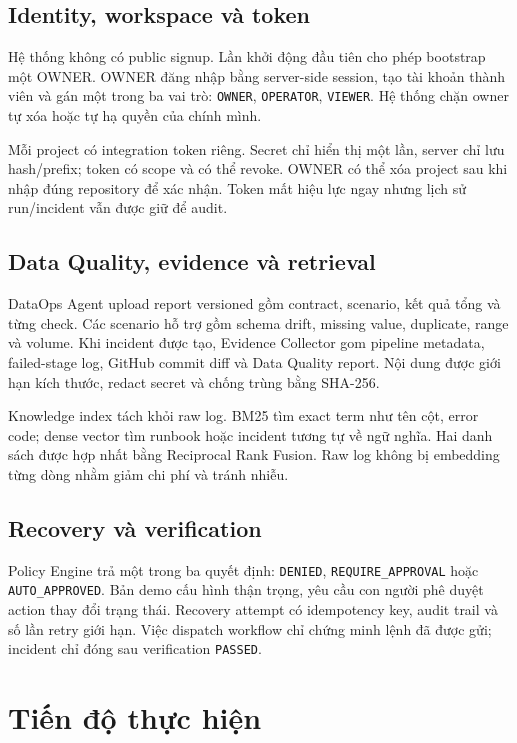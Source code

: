 \documentclass[12pt,a4paper,oneside]{report}
\newcommand{\code}[1]{\texttt{#1}}
\begin{document}
\section{Identity, workspace và token}

Hệ thống không có public signup. Lần khởi động đầu tiên cho phép bootstrap một OWNER. OWNER đăng
nhập bằng server-side session, tạo tài khoản thành viên và gán một trong ba vai trò:
\code{OWNER}, \code{OPERATOR}, \code{VIEWER}. Hệ thống chặn owner tự xóa hoặc tự hạ quyền của
chính mình.

Mỗi project có integration token riêng. Secret chỉ hiển thị một lần, server chỉ lưu hash/prefix;
token có scope và có thể revoke. OWNER có thể xóa project sau khi nhập đúng repository để xác nhận.
Token mất hiệu lực ngay nhưng lịch sử run/incident vẫn được giữ để audit.

\section{Data Quality, evidence và retrieval}

DataOps Agent upload report versioned gồm contract, scenario, kết quả tổng và từng check. Các
scenario hỗ trợ gồm schema drift, missing value, duplicate, range và volume. Khi incident được
tạo, Evidence Collector gom pipeline metadata, failed-stage log, GitHub commit diff và Data
Quality report. Nội dung được giới hạn kích thước, redact secret và chống trùng bằng SHA-256.

Knowledge index tách khỏi raw log. BM25 tìm exact term như tên cột, error code; dense vector tìm
runbook hoặc incident tương tự về ngữ nghĩa. Hai danh sách được hợp nhất bằng Reciprocal Rank
Fusion. Raw log không bị embedding từng dòng nhằm giảm chi phí và tránh nhiễu.

\section{Recovery và verification}

Policy Engine trả một trong ba quyết định: \code{DENIED}, \code{REQUIRE\_APPROVAL} hoặc
\code{AUTO\_APPROVED}. Bản demo cấu hình thận trọng, yêu cầu con người phê duyệt action thay đổi
trạng thái. Recovery attempt có idempotency key, audit trail và số lần retry giới hạn. Việc
dispatch workflow chỉ chứng minh lệnh đã được gửi; incident chỉ đóng sau verification \code{PASSED}.

\chapter{Tiến độ thực hiện}
\end{document}
